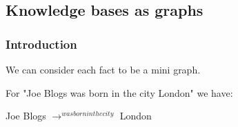 
\subsection{Knowledge bases as graphs}

\subsubsection{Introduction}

We can consider each fact to be a mini graph.

For "Joe Blogs was born in the city London" we have:

Joe Blogs \(\rightarrow^{was born in the city }\) London

